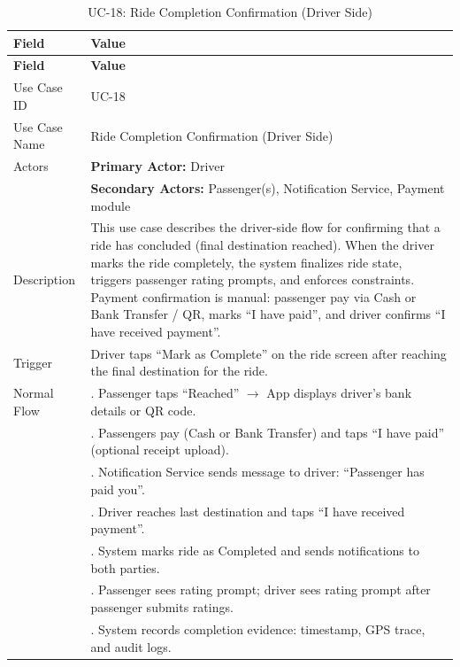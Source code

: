 \begin{longtable}{|>{\raggedright\arraybackslash}p{4cm}|>{\raggedright\arraybackslash}p{11cm}|}
\caption{UC-18: Ride Completion Confirmation (Driver Side)}
\label{tab:uc-18} \\
\hline
\rowcolor{lightgray!30}
\textbf{Field} & \textbf{Value} \\
\hline
\endfirsthead
\hline
\rowcolor{lightgray!30}
\textbf{Field} & \textbf{Value} \\
\hline
\endhead
\hline
\endfoot
\hline
\endlastfoot
Use Case ID & UC-18 \\
\hline
Use Case Name & Ride Completion Confirmation (Driver Side) \\
\hline
Actors & \textbf{Primary Actor:} Driver \\
& \textbf{Secondary Actors:} Passenger(s), Notification Service, Payment module \\
\hline
Description & This use case describes the driver-side flow for confirming that a ride has concluded (final destination reached). When the driver marks the ride completely, the system finalizes ride state, triggers passenger rating prompts, and enforces constraints. Payment confirmation is manual: passenger pay via Cash or Bank Transfer / QR, marks ``I have paid'', and driver confirms ``I have received payment''. \\
\hline
Trigger & Driver taps ``Mark as Complete'' on the ride screen after reaching the final destination for the ride. \\
\hline
Normal Flow & 1. Passenger taps ``Reached'' $\rightarrow$ App displays driver's bank details or QR code. \\
& 2. Passengers pay (Cash or Bank Transfer) and taps ``I have paid'' (optional receipt upload). \\
& 3. Notification Service sends message to driver: ``Passenger has paid you''. \\
& 4. Driver reaches last destination and taps ``I have received payment''. \\
& 5. System marks ride as Completed and sends notifications to both parties. \\
& 6. Passenger sees rating prompt; driver sees rating prompt after passenger submits ratings. \\
& 7. System records completion evidence: timestamp, GPS trace, and audit logs. \\

\end{longtable}
